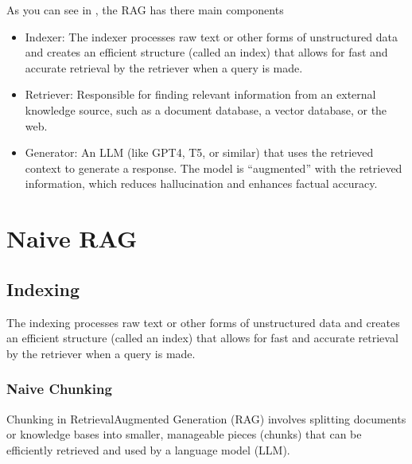 \documentclass[letterpaper,11pt,english]{sphinxmanual}
\begin{document}
\sphinxAtStartPar
As you can see in {\hyperref[\detokenize{rag:fig-rag}]{}}, the RAG has there main  components
\begin{itemize}
\item {} 
\sphinxAtStartPar
Indexer: The indexer processes raw text or other forms of unstructured data and creates an
efficient structure (called an index) that allows for fast and accurate retrieval
by the retriever when a query is made.

\item {} 
\sphinxAtStartPar
Retriever: Responsible for finding relevant information from an external knowledge source,
such as a document database, a vector database, or the web.

\item {} 
\sphinxAtStartPar
Generator: An LLM (like GPT\sphinxhyphen{}4, T5, or similar) that uses the retrieved context to generate a response.
The model is “augmented” with the retrieved information, which reduces hallucination and enhances factual accuracy.

\end{itemize}


\section{Naive RAG}
\label{\detokenize{rag:naive-rag}}

\subsection{Indexing}
\label{\detokenize{rag:indexing}}
\sphinxAtStartPar
The indexing processes raw text or other forms of unstructured data and creates an efficient structure
(called an index) that allows for fast and accurate retrieval by the retriever when a query is made.

\begin{figure}[htbp]
\centering

\noindent{}
\end{figure}


\subsubsection{Naive Chunking}
\label{\detokenize{rag:naive-chunking}}
\sphinxAtStartPar
Chunking in Retrieval\sphinxhyphen{}Augmented Generation (RAG) involves splitting documents or knowledge bases
into smaller, manageable pieces (chunks) that can be efficiently retrieved and used by a language model (LLM).
\end{document}
